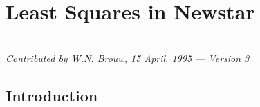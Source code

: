 


\setlength{\unitlength}{1mm}
\setlength{\parindent}{0mm}
\setlength{\parskip}{\medskipamount}

\pagestyle{plain}                     %




\newcommand{\LSQ}{{\em LSQ}}
\newcommand{\SVD}{{\em SVD}}
\newcommand{\Cond}{{\em condition}}
\newcommand{\Weight}{{\em weight}}
\newcommand{\Known}{{\em measured}}
\newcommand{\Sol}{{\em solution}}
\newcommand{\Type}{{\em type}}
\newcommand{\Error}{{\em error}}
\newcommand{\Covar}{{\em covariance}}
\newcommand{\Xsd}{{\em uncertainties}}
\newcommand{\Mean}{{\em sd}}
\newcommand{\Fit}{{\em goodness}}
\newcommand{\Rank}{{\em rank}}
\newcommand{\Prec}{{\em collinearity}}
\newcommand{\Nconst}{{\em n-constraint}}
\newcommand{\Constraint}{{\em constraints}}
\newcommand{\Real}{{\sc real}}
\newcommand{\Int}{{\sc integer}}
\newcommand{\Complex}{{\sc complex}}
\newcommand{\Logic}{{\sc logical}}
\newcommand{\Mn}{{\vspace{-0.5em}}}
 \renewcommand{\mathbf}[1]{\mbox{$\boldmath #1$}}

\chapter{Least Squares in Newstar}
\\
{\it Contributed by W.N. Brouw, 15 April, 1995 --- Version 3}
\tableofcontents


\section{Introduction}
\label{s-Intro}

